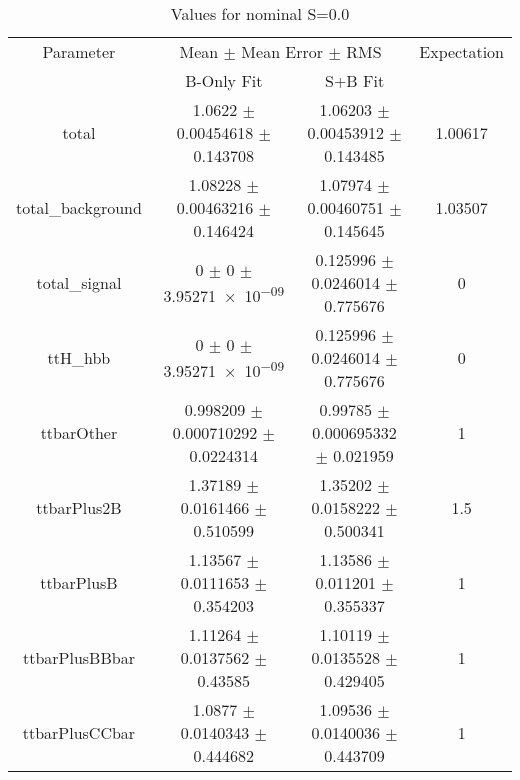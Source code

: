\begin{table}
\centering
\caption{Values for nominal S=0.0}
\begin{tabular}{cccc}
\toprule
Parameter & \multicolumn{2}{c}{Mean $\pm$ Mean Error $\pm$ RMS} & Expectation\\
 & B-Only Fit & S+B Fit & \\
\midrule
total & \num{1.0622} $\pm$ \num{0.00454618} $\pm$ \num{0.143708} & \num{1.06203} $\pm$ \num{0.00453912} $\pm$ \num{0.143485} & \num{1.00617}\\
total\_background & \num{1.08228} $\pm$ \num{0.00463216} $\pm$ \num{0.146424} & \num{1.07974} $\pm$ \num{0.00460751} $\pm$ \num{0.145645} & \num{1.03507}\\
total\_signal & \num{0} $\pm$ \num{0} $\pm$ \num{3.95271e-09} & \num{0.125996} $\pm$ \num{0.0246014} $\pm$ \num{0.775676} & \num{0}\\
ttH\_hbb & \num{0} $\pm$ \num{0} $\pm$ \num{3.95271e-09} & \num{0.125996} $\pm$ \num{0.0246014} $\pm$ \num{0.775676} & \num{0}\\
ttbarOther & \num{0.998209} $\pm$ \num{0.000710292} $\pm$ \num{0.0224314} & \num{0.99785} $\pm$ \num{0.000695332} $\pm$ \num{0.021959} & \num{1}\\
ttbarPlus2B & \num{1.37189} $\pm$ \num{0.0161466} $\pm$ \num{0.510599} & \num{1.35202} $\pm$ \num{0.0158222} $\pm$ \num{0.500341} & \num{1.5}\\
ttbarPlusB & \num{1.13567} $\pm$ \num{0.0111653} $\pm$ \num{0.354203} & \num{1.13586} $\pm$ \num{0.011201} $\pm$ \num{0.355337} & \num{1}\\
ttbarPlusBBbar & \num{1.11264} $\pm$ \num{0.0137562} $\pm$ \num{0.43585} & \num{1.10119} $\pm$ \num{0.0135528} $\pm$ \num{0.429405} & \num{1}\\
ttbarPlusCCbar & \num{1.0877} $\pm$ \num{0.0140343} $\pm$ \num{0.444682} & \num{1.09536} $\pm$ \num{0.0140036} $\pm$ \num{0.443709} & \num{1}\\
\bottomrule
\end{tabular}
\end{table}